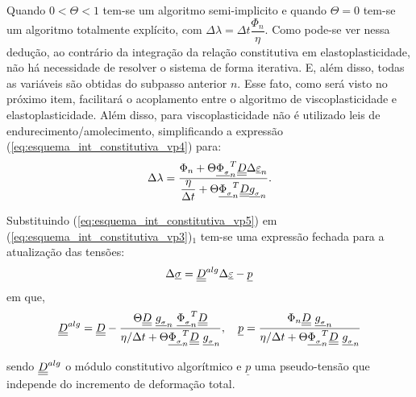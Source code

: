 Quando $0 < \Theta < 1$  tem-se um algoritmo semi-implicito e quando $\Theta = 0$ tem-se um algoritmo totalmente explícito, com $\Delta \lambda = \Delta t \dfrac{\Phi_n}{\eta}$. Como pode-se ver nessa dedução, ao contrário da integração da relação constitutiva em elastoplasticidade, não há necessidade de resolver o sistema de forma iterativa. E, além disso, todas as variáveis são obtidas do subpasso anterior $n$. Esse fato, como será visto no próximo item, facilitará o acoplamento entre o algoritmo de viscoplasticidade e elastoplasticidade. Além disso, para viscoplasticidade não é utilizado leis de endurecimento/amolecimento, simplificando a expressão (\ref{eq:esquema_int_constitutiva_vp4}) para:
\begin{equation}
	\label{eq:esquema_int_constitutiva_vp5}
	\Delta \lambda = \dfrac{\Phi_n + \Theta \underline{\Phi_{_\sigma}}_n^T\underline{\underline D}\Delta\underline{\varepsilon}_n}{\dfrac{\eta}{\Delta t} + \Theta \underline{\Phi_{_\sigma}}_n^T\underline{\underline D}\underline{g_{_\sigma}}_n}.
\end{equation}

Substituindo (\ref{eq:esquema_int_constitutiva_vp5}) em (\ref{eq:esquema_int_constitutiva_vp3})$_1$ tem-se uma expressão fechada para a atualização das tensões:
\begin{equation}
	\label{eq:esquema_int_constitutiva_vp6}
	\Delta \underline \sigma = \underline{\underline D}^{alg} \Delta \underline{\varepsilon} - \underline p
\end{equation}
em que,
\begin{equation}
	\label{eq:esquema_int_constitutiva_vp6}
	\underline{\underline D}^{alg} = \underline{\underline D} - \dfrac{\Theta \underline{\underline D}~\underline{g_{_\sigma}}_n~\underline{\Phi_{_\sigma}}_n^T \underline{\underline D}}{\eta/\Delta t+ \Theta \underline{\Phi_{_\sigma}}_n^T\underline{\underline D}~\underline{g_{_\sigma}}_n},~~~\underline p = \dfrac{\Phi_n \underline{\underline D} ~\underline{g_{_\sigma}}_n}{\eta/\Delta t+ \Theta \underline{\Phi_{_\sigma}}_n^T\underline{\underline D}~\underline{g_{_\sigma}}_n}
\end{equation}

sendo $\underline{\underline D}^{alg}$ o módulo constitutivo algorítmico e $\underline p$ uma pseudo-tensão que independe do incremento de deformação total.


